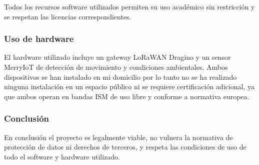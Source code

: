 Todos los recursos software utilizados permiten su uso académico sin restricción y se respetan las licencias correspondientes.

\subsubsection{Uso de hardware}

El hardware utilizado incluye un gateway LoRaWAN Dragino y un sensor MerryIoT de detección de movimiento y condiciones ambientales. Ambos dispositivos se han instalado en mi domicilio por lo tanto no se ha realizado ninguna instalación en un espacio público ni se requiere certificación adicional, ya que ambos operan en bandas ISM de uso libre y conforme a normativa europea.

\subsubsection{Conclusión}

En conclusión  el proyecto es legalmente viable, no vulnera la normativa de protección de datos ni derechos de terceros, y respeta las condiciones de uso de todo el software y hardware utilizado.




